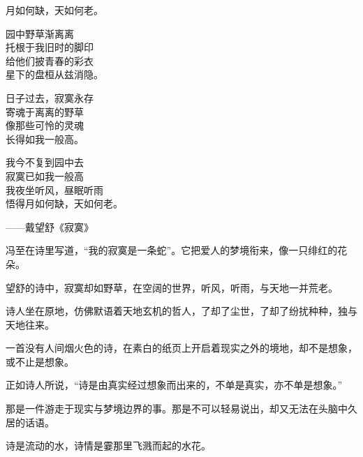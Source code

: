 		月如何缺，天如何老。

		\longpoem{}{}{}
			园中野草渐离离 \\
			托根于我旧时的脚印 \\
			给他们披青春的彩衣 \\
			星下的盘桓从兹消隐。

			日子过去，寂寞永存 \\
			寄魂于离离的野草 \\
			像那些可怜的灵魂 \\
			长得如我一般高。

			我今不复到园中去 \\
			寂寞已如我一般高 \\
			我夜坐听风，昼眠听雨 \\
			悟得月如何缺，天如何老。

			\hspace{4em} ——戴望舒《寂寞》
		\endlongpoem

		冯至在诗里写道，“我的寂寞是一条蛇”。它把爱人的梦境衔来，像一只绯红的花朵。\par
		望舒的诗中，寂寞却如野草，在空阔的世界，听风，听雨，与天地一并荒老。\par
		诗人坐在原地，仿佛默语着天地玄机的哲人，了却了尘世，了却了纷扰种种，独与天地往来。\par
		一首没有人间烟火色的诗，在素白的纸页上开启着现实之外的境地，却不是想象，或不止是想象。\par
		正如诗人所说，“诗是由真实经过想象而出来的，不单是真实，亦不单是想象。”\par
		那是一件游走于现实与梦境边界的事。那是不可以轻易说出，却又无法在头脑中久居的话语。\par
		诗是流动的水，诗情是霎那里飞溅而起的水花。

